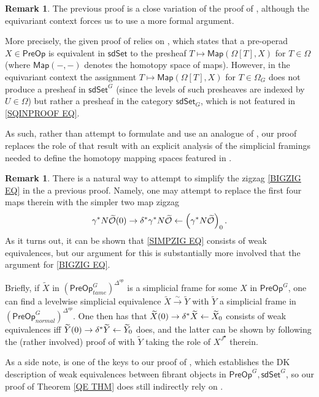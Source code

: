 \documentclass[a4paper,10pt]{article}%
\numberwithin{equation}{section}
\numberwithin{figure}{section}
\theoremstyle{definition} %
\newtheorem{remark}[equation]{Remark}%
\renewcommand{\O}{\ensuremath{\mathcal O}}
\newcommand{\1}{\ensuremath{\mathbbm 1}}%
\begin{document}
\begin{remark}
	The previous proof is a close variation of 
	the proof of \cite[Thm. 8.14]{CM13b},
	although the equivariant context 
	forces us to use a more formal argument.
	
	More precisely, the given proof of \cite[Thm. 8.14]{CM13b}
	relies on 
	\cite[Thm 5.9(v)]{CM13b},
	which states that a pre-operad
	$X \in \mathsf{PreOp}$
	is equivalent in $\mathsf{sdSet}$
	to the presheaf
	$T \mapsto \mathsf{Map}(\Omega[T],X)$
	for $T \in \Omega$
	(where $\mathsf{Map}(-,-)$
	denotes the homotopy space of maps).
	However, in the equivariant context
	the assignment 
	$T \mapsto \mathsf{Map}(\Omega[T],X)$
	for $T \in \Omega_G$
	does not produce a presheaf in 
	$\mathsf{sdSet}^G$
	(since the levels of such presheaves are indexed by
	$U \in \Omega$)
	but rather a presheaf in the category
	$\mathsf{sdSet}_G$,
	which is not featured in 
	\eqref{SQINPROOF EQ}.
	
	As such, rather than attempt to formulate and use
	an analogue of \cite[Thm 5.9(v)]{CM13b},
	our proof replaces the role of that result with 
	an explicit analysis of the simplicial framings
	needed to define the homotopy mapping spaces
	featured in \cite[Thm 5.9(v)]{CM13b}.
\end{remark}



\begin{remark}
	There is a natural way to attempt to simplify the zigzag
	\eqref{BIGZIG EQ}
	in the a previous proof. 
	Namely, one may attempt to replace the first four maps therein
	with the simpler two map zigzag
\begin{equation}\label{SIMPZIG EQ}
	\gamma^{\**} N \widetilde{\O}(0)
\to 
	\delta^{\**} \gamma^{\**} N \widetilde{\O}
\leftarrow
	\left(\gamma^{\**} N \widetilde{\O}\right)_0.
\end{equation}
As it turns out, it can be shown that 
\eqref{SIMPZIG EQ} consists of weak equivalences, 
but our argument for this is substantially more involved that the argument for \eqref{BIGZIG EQ}.

Briefly, if $\widetilde{X}$
in $\left(\mathsf{PreOp}^G_{tame}\right)^{\Delta^{op}}$
is a simplicial frame for some $X$ in 
$\mathsf{PreOp}^G$,
one can find a levelwise simplicial equivalence
$\widetilde{X} \xrightarrow{\sim} \widetilde{Y}$
with $\widetilde{Y}$
a simplicial frame in
$\left(\mathsf{PreOp}^G_{normal}\right)^{\Delta^{op}}$.
One then has that 
$\widetilde{X}(0) \to \delta^{\**}\widetilde{X} \leftarrow \widetilde{X}_0$ 
consists of weak equivalences iff
$\widetilde{Y}(0) \to \delta^{\**}\widetilde{Y} \leftarrow \widetilde{Y}_0$ does,
and the latter can be shown by following the
(rather involved) proof of 
\cite[Prop. 5.41]{BP_edss}
with $\widetilde{Y}$ taking the role
of $X^{J^{\bullet}}$ therein.

As a side note, 
\cite[Prop. 5.41]{BP_edss} is one of the keys to our proof of
\cite[Thm. 5.48]{BP_edss}, 
which establishes the DK description of weak equivalences between fibrant objects in
$\mathsf{PreOp}^G,\mathsf{sdSet}^G$,
so our proof of Theorem \ref{QE THM}
does still indirectly rely on \cite[Prop. 5.41]{BP_edss}.
\end{remark}
\end{document}
